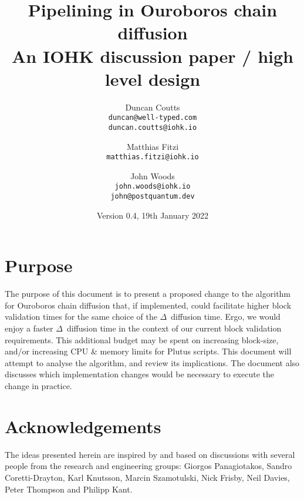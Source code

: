 \documentclass[11pt,a4paper]{article}
\begin{document}
\title {Pipelining in Ouroboros chain diffusion\\
       {\large \sc An IOHK discussion paper / high level design}}
\date  {Version 0.4, 19th January 2022}
\author{Duncan Coutts      \\ {\small \texttt{duncan@well-typed.com}} \\
                              {\small \texttt{duncan.coutts@iohk.io}} \\
   \and Matthias Fitzi     \\ {\small \texttt{matthias.fitzi@iohk.io}} \\
   \and John Woods         \\ {\small \texttt{john.woods@iohk.io}} \\
                              {\small \texttt{john@postquantum.dev}} \\
}

\maketitle

\section{Purpose}
The purpose of this document is to present a proposed change to the algorithm
for Ouroboros chain diffusion that, if implemented, could facilitate higher block validation times
for the same choice of the $\Delta$~diffusion time.
Ergo, we would enjoy a faster $\Delta$~diffusion time in the context of our current block validation requirements.
This additional budget may be spent on increasing block-size, and/or increasing CPU \& memory limits for Plutus scripts.
This document will attempt to analyse the algorithm, and review its implications. The document also discusses which 
implementation changes would be necessary to execute the change in practice.

\pagebreak

\tableofcontents

\pagebreak

\section{Acknowledgements}
The ideas presented herein are inspired by and based on discussions with several
people from the research and engineering groups: Giorgos Panagiotakos,
Sandro Coretti-Drayton, Karl Knutsson, Marcin Szamotulski, Nick Frisby,
Neil Davies, Peter Thompson and Philipp Kant.
\end{document}
